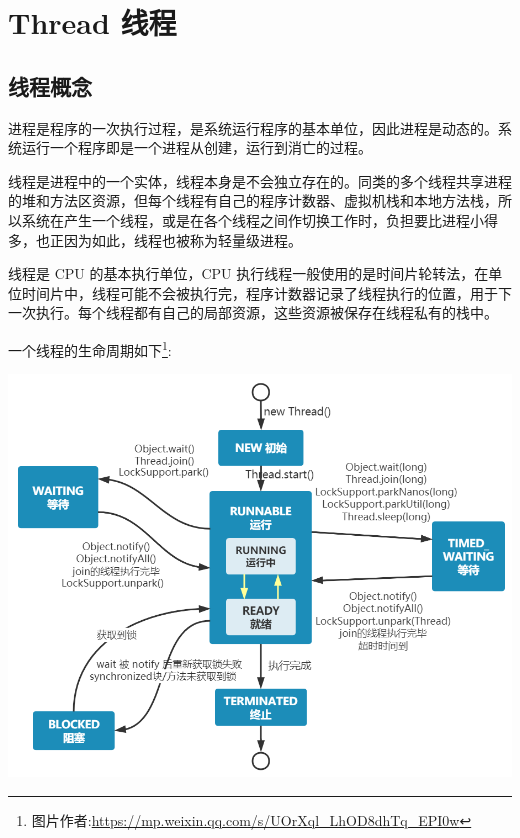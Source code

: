 \section{Thread 线程}
\subsection{线程概念}

进程是程序的一次执行过程，是系统运行程序的基本单位，因此进程是动态的。系统运行一个程序即是一个进程从创建，运行到消亡的过程。

线程是进程中的一个实体，线程本身是不会独立存在的。同类的多个线程共享进程的堆和方法区资源，但每个线程有自己的程序计数器、虚拟机栈和本地方法栈，所以系统在产生一个线程，或是在各个线程之间作切换工作时，负担要比进程小得多，也正因为如此，线程也被称为轻量级进程。

线程是 CPU 的基本执行单位，CPU 执行线程一般使用的是时间片轮转法，在单位时间片中，线程可能不会被执行完，程序计数器记录了线程执行的位置，用于下一次执行。每个线程都有自己的局部资源，这些资源被保存在线程私有的栈中。

一个线程的生命周期如下\footnote{图片作者:\url{https://mp.weixin.qq.com/s/UOrXql_LhOD8dhTq_EPI0w}}:

\begin{center}
    \includegraphics[width=0.8\linewidth]{../../Images/ThreadProcess.png}
\end{center}

